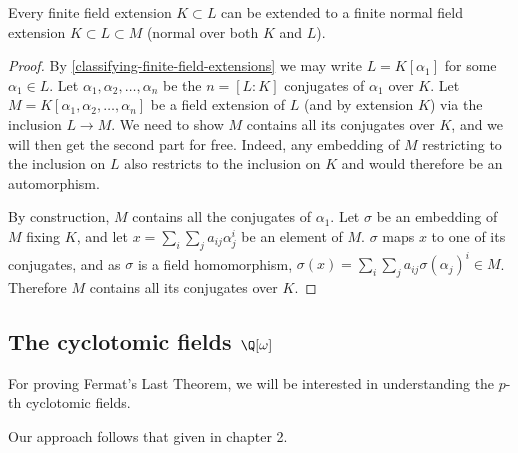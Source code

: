 \begin{theorem}
Every finite field extension $K\subset L$ can be extended to a finite normal field extension $K\subset L \subset M$ (normal over both $K$ and $L$).
\end{theorem}
\begin{proof}
By \cref{classifying-finite-field-extensions} we may write $L=K[\alpha_1]$ for some $\alpha_1 \in L$. Let $\alpha_1,\alpha_2,\dots,\alpha_n$ be the $n=[L:K]$ conjugates of $\alpha_1$ over $K$. Let $M=K[\alpha_1,\alpha_2,\dots,\alpha_n]$ be a field extension of $L$ (and by extension $K$) via the inclusion $L\rightarrow M$. We need to show $M$ contains all its conjugates over $K$, and we will then get the second part for free. Indeed, any embedding of $M$ restricting to the inclusion on $L$ also restricts to the inclusion on $K$ and would therefore be an automorphism.

By construction, $M$ contains all the conjugates of $\alpha_1$. Let $\sigma$ be an embedding of $M$ fixing $K$, and let $x=\sum_i \sum_j a_{ij}\alpha_j^i$ be an element of $M$. $\sigma$ maps $x$ to one of its conjugates, and as $\sigma$ is a field homomorphism, $\sigma(x)=\sum_i \sum_j a_{ij}\sigma(\alpha_j)^i\in M$. Therefore $M$ contains all its conjugates over $K$.
\end{proof}
\subsection{The cyclotomic fields $\Q[\omega]$}
For proving Fermat's Last Theorem, we will be interested in understanding the $p$-th cyclotomic fields. 

 Our approach follows that given in \cite{NumberFields} chapter 2.

